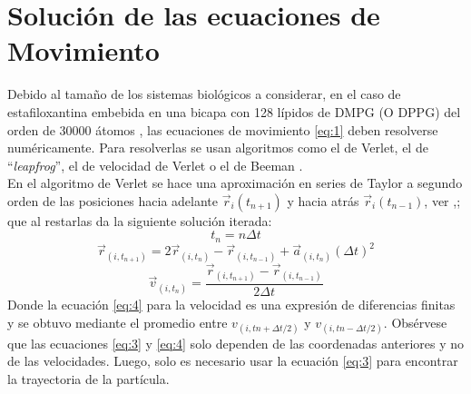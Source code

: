 \section{Soluci\'{o}n de las ecuaciones de Movimiento}
Debido al tama\~no de los sistemas biol\'{o}gicos a considerar, en el caso de estafiloxantina embebida en una bicapa con 128 l\'{i}pidos de DMPG (O DPPG) del orden de 30000 \'{a}tomos \cite{Melendez-Delgado2018StudyingBilayers}, las ecuaciones de movimiento \eqref{eq:1} deben resolverse num\'{e}ricamente. Para resolverlas se usan algoritmos como el de Verlet, el de ``\textit{leapfrog}'', el de velocidad de Verlet o el de Beeman \cite{Mazur1997CommonRevisited}.\\
En el algoritmo de Verlet se hace una aproximaci\'{o}n en series de Taylor a segundo orden de las posiciones hacia adelante $\vec{r}_{i}(t_{n+1})$ y hacia atr\'{a}s $\vec{r}_{i}(t_{n-1})$, ver \cite{Melendez-Delgado2018StudyingBilayers},\cite{Mazur1997CommonRevisited}; que al restarlas da la siguiente soluci\'{o}n iterada:
\begin{equation}\label{eq:8}
t_{n}=n\Delta t
\end{equation}
\begin{equation}\label{eq:9}
\vec{r}_{(i,t_{n+1})}=2\vec{r}_{(i,t_{n})}-\vec{r}_{(i,t_{n-1})}+\vec{a}_{(i,t_{n})}(\Delta t)^2
\end{equation}
\begin{equation}\label{eq:10}
\vec{v}_{(i,t_{n})}=\frac{\vec{r}_{(i,t_{n+1})}-\vec{r}_{(i,t_{n-1})}}{2\Delta t}
\end{equation}
Donde la ecuaci\'{o}n \eqref{eq:4} para la velocidad es una expresi\'{o}n de diferencias finitas y se obtuvo mediante el promedio entre $v_{(i,tn+\Delta t/2)}$ y $v_{(i,tn-\Delta t/2)}$.
Obs\'{e}rvese que las ecuaciones \eqref{eq:3} y \eqref{eq:4} solo dependen de las coordenadas anteriores y no de las velocidades. Luego, solo es necesario usar la ecuaci\'{o}n \eqref{eq:3} para encontrar la trayectoria de la part\'{i}cula.\\

